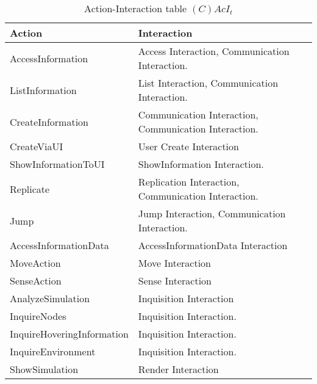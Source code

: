 \begin{table}[H]
	\centering
	\begin{tabular}{|p{5cm}|p{7cm}|}
			\hline
			\textbf{Action} & \textbf{Interaction} \\
			\hline
			AccessInformation & Access Interaction, Communication Interaction. \\
			\hline
			ListInformation & List Interaction, Communication Interaction. \\
			\hline
			CreateInformation & Communication Interaction, Communication Interaction.\\
			\hline
			CreateViaUI & User Create Interaction \\
			\hline
      ShowInformationToUI & ShowInformation Interaction.\\
			\hline
			Replicate & Replication Interaction, Communication Interaction.  \\
			\hline
			Jump & Jump Interaction, Communication Interaction. \\
			\hline
			AccessInformationData & AccessInformationData Interaction \\
			\hline
			MoveAction & Move Interaction \\
			\hline
			SenseAction & Sense Interaction \\
			\hline
			AnalyzeSimulation & Inquisition Interaction \\
			\hline
			InquireNodes & Inquisition Interaction. \\
			\hline
			InquireHoveringInformation & Inquisition Interaction. \\
			\hline
			InquireEnvironment & Inquisition Interaction. \\
			\hline
			ShowSimulation & Render Interaction \\
			\hline
		\end{tabular}
	\caption{Action-Interaction table $(C)AcI_t$}
	\label{tab:cacit}
\end{table}


